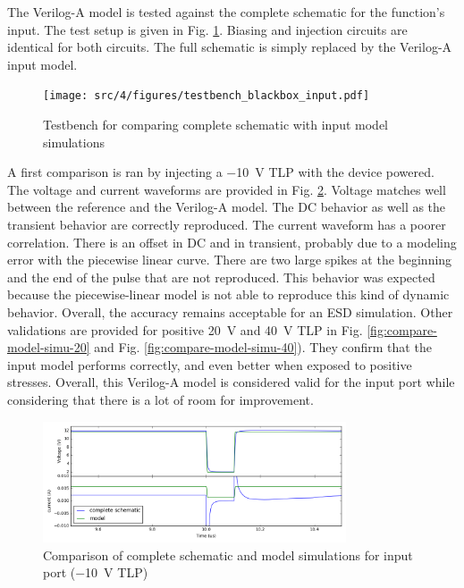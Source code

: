 The Verilog-A model is tested against the complete schematic for the function's input.
The test setup is given in Fig. \ref{fig:compare-veriloga-model-input}.
Biasing and injection circuits are identical for both circuits.
The full schematic is simply replaced by the Verilog-A input model.

\begin{figure}[!h]
  \centering
  \texttt{[image: src/4/figures/testbench\_blackbox\_input.pdf]}
  \caption{Testbench for comparing complete schematic with input model simulations}
  \label{fig:compare-veriloga-model-input}
\end{figure}

A first comparison is ran by injecting a \SI{-10}{\volt} TLP with the device powered.
The voltage and current waveforms are provided in Fig. \ref{fig:compare-model-simu-m10}.
Voltage matches well between the reference and the Verilog-A model.
The DC behavior as well as the transient behavior are correctly reproduced.
The current waveform has a poorer correlation.
There is an offset in DC and in transient, probably due to a modeling error with the piecewise linear curve.
There are two large spikes at the beginning and the end of the pulse that are not reproduced.
This behavior was expected because the piecewise-linear model is not able to reproduce this kind of dynamic behavior.
Overall, the accuracy remains acceptable for an ESD simulation.
Other validations are provided for positive \SI{20}{\volt} and \SI{40}{\volt} TLP in Fig. \ref{fig:compare-model-simu-20} and Fig. \ref{fig:compare-model-simu-40}).
They confirm that the input model performs correctly, and even better when exposed to positive stresses.
Overall, this Verilog-A model is considered valid for the input port while considering that there is a lot of room for improvement.

\begin{figure}[!p]
  \centering
  \includegraphics[width=0.8\textwidth]{src/4/figures/comparison_model_total_m10V.png}
  \caption{Comparison of complete schematic and model simulations for input port (\SI{-10}{\volt} TLP)}
  \label{fig:compare-model-simu-m10}
\end{figure}

